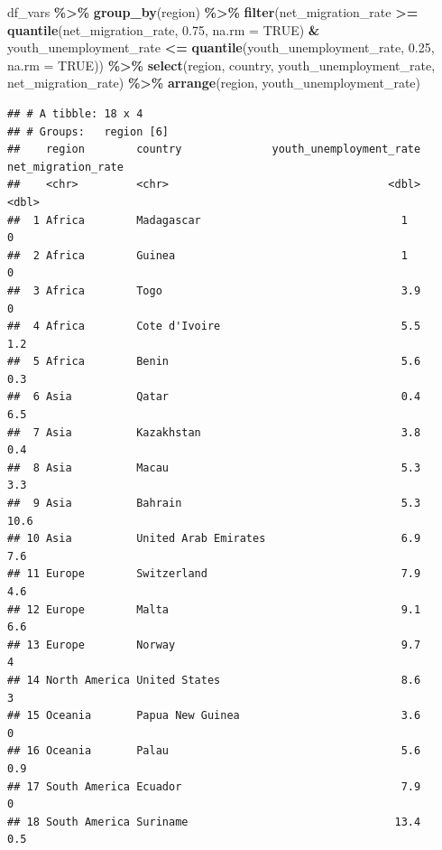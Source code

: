 \documentclass[
]{article}
\newenvironment{Shaded}{\begin{snugshade}}{\end{snugshade}}
\newcommand{\AttributeTok}[1]{\textcolor[rgb]{0.13,0.29,0.53}{#1}}
\newcommand{\ConstantTok}[1]{\textcolor[rgb]{0.56,0.35,0.01}{#1}}
\newcommand{\FloatTok}[1]{\textcolor[rgb]{0.00,0.00,0.81}{#1}}
\newcommand{\FunctionTok}[1]{\textcolor[rgb]{0.13,0.29,0.53}{\textbf{#1}}}
\newcommand{\NormalTok}[1]{#1}
\newcommand{\SpecialCharTok}[1]{\textcolor[rgb]{0.81,0.36,0.00}{\textbf{#1}}}
\begin{document}
\begin{Shaded}
\begin{Highlighting}[]
\NormalTok{df\_vars }\SpecialCharTok{\%\textgreater{}\%}
  \FunctionTok{group\_by}\NormalTok{(region) }\SpecialCharTok{\%\textgreater{}\%}
  \FunctionTok{filter}\NormalTok{(net\_migration\_rate }\SpecialCharTok{\textgreater{}=} \FunctionTok{quantile}\NormalTok{(net\_migration\_rate, }\FloatTok{0.75}\NormalTok{, }\AttributeTok{na.rm =} \ConstantTok{TRUE}\NormalTok{) }\SpecialCharTok{\&}
\NormalTok{         youth\_unemployment\_rate }\SpecialCharTok{\textless{}=} \FunctionTok{quantile}\NormalTok{(youth\_unemployment\_rate, }\FloatTok{0.25}\NormalTok{, }\AttributeTok{na.rm =} \ConstantTok{TRUE}\NormalTok{)) }\SpecialCharTok{\%\textgreater{}\%}
  \FunctionTok{select}\NormalTok{(region, country, youth\_unemployment\_rate, net\_migration\_rate) }\SpecialCharTok{\%\textgreater{}\%}
  \FunctionTok{arrange}\NormalTok{(region, youth\_unemployment\_rate)}
\end{Highlighting}
\end{Shaded}

\begin{verbatim}
## # A tibble: 18 x 4
## # Groups:   region [6]
##    region        country              youth_unemployment_rate net_migration_rate
##    <chr>         <chr>                                  <dbl>              <dbl>
##  1 Africa        Madagascar                               1                  0  
##  2 Africa        Guinea                                   1                  0  
##  3 Africa        Togo                                     3.9                0  
##  4 Africa        Cote d'Ivoire                            5.5                1.2
##  5 Africa        Benin                                    5.6                0.3
##  6 Asia          Qatar                                    0.4                6.5
##  7 Asia          Kazakhstan                               3.8                0.4
##  8 Asia          Macau                                    5.3                3.3
##  9 Asia          Bahrain                                  5.3               10.6
## 10 Asia          United Arab Emirates                     6.9                7.6
## 11 Europe        Switzerland                              7.9                4.6
## 12 Europe        Malta                                    9.1                6.6
## 13 Europe        Norway                                   9.7                4  
## 14 North America United States                            8.6                3  
## 15 Oceania       Papua New Guinea                         3.6                0  
## 16 Oceania       Palau                                    5.6                0.9
## 17 South America Ecuador                                  7.9                0  
## 18 South America Suriname                                13.4                0.5
\end{verbatim}
\end{document}
